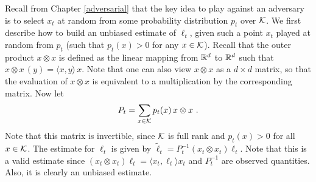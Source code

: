 Recall from Chapter \ref{adversarial} that the key idea to play against an adversary is to select $x_t$ at random from some probability distribution $p_t$ over $\mathcal{K}$. We first describe how to build an unbiased estimate of $\ell_t$, given such a point $x_t$ played at random from $p_t$ (such that $p_t(x) > 0$  for any $x \in \mathcal{K}$). Recall that the outer product $x \otimes x$ is defined as the linear mapping from $\mathbb{R}^d$ to $\mathbb{R}^d$ such that $x \otimes x\, (y) = \langle x, y \rangle\, x$. Note that one can also view $x \otimes x$ as a $d \times d$ matrix, so that the evaluation of $x \otimes x$ is equivalent to a multiplication by the corresponding matrix. Now let
$$P_t = \sum_{x \in \mathcal{K}} {p}_t(x)\, x \otimes x~.$$
Note that this matrix is invertible, since $\mathcal{K}$ is full rank and $p_t(x) > 0$ for all $x \in \mathcal{K}$. The estimate for $\ell_t$ is given by
$
\tilde{\ell}_t = P_t^{-1} \left(x_t \otimes x_t\right) \ell_t
$.
Note that this is a valid estimate since $\left(x_t \otimes x_t\right) \ell_t = \langle x_t, \ell_t \rangle x_t$ and $P_t^{-1}$ are observed quantities. Also, it is clearly an unbiased estimate.
 
